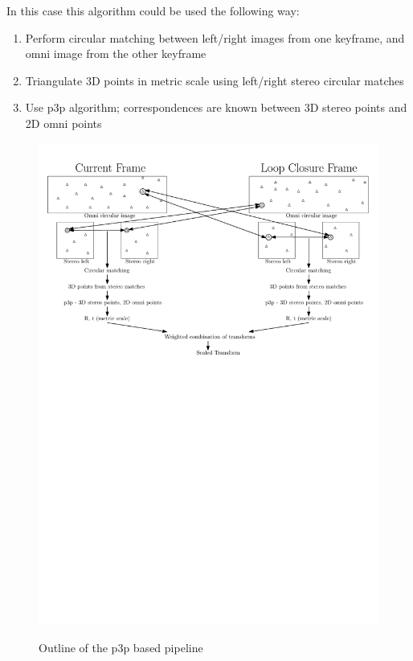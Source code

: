 In this case this algorithm could be used the following way:

\begin{enumerate}
\itemsep0em
 \item Perform circular matching between left/right images from one keyframe, and omni image from the other keyframe
 \item Triangulate 3D points in metric scale using left/right stereo circular matches
 \item Use p3p algorithm; correspondences are known between 3D stereo points and 2D omni points
\end{enumerate}

\begin{figure}[H]
  \centering
    \includegraphics[width=1.0\textwidth]{chapters/images/6_images_p3p}\\
  \caption{Outline of the p3p based pipeline}
  \label{fig:p3p_flowchart}
\end{figure}

